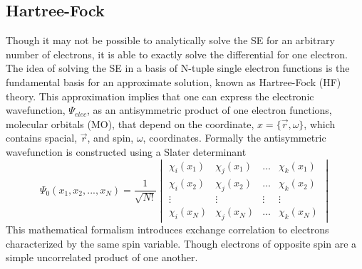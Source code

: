   \subsection{Hartree-Fock}
    Though it may not be possible to analytically solve the SE for an arbitrary number of electrons, it is able to exactly solve the differential for one electron.  The idea of solving the SE in a basis of N-tuple single electron functions is the fundamental basis for an approximate solution, known as Hartree-Fock (HF) theory. \cite{Hartree1928,Fock1930,SzaboAttila1982,Sherril2000} This approximation implies that one can express the electronic wavefunction, $\Psi_{elec}$, as an antisymmetric product of one electron functions, molecular orbitals (MO), that depend on the coordinate, $x = \{\vec{r}, \omega\}$, which contains spacial, $\vec{r}$, and spin, $\omega$, coordinates. Formally the antisymmetric wavefunction is constructed using a Slater determinant\cite{Slater1929,Slater1930} 
    \begin{equation}
    \Psi_{0}(x_1, x_2, ..., x_N) = \frac{1}{\sqrt{N!}}
    \begin{vmatrix}
     \chi_i(x_1) &\chi_j(x_1) &\ldots   &\chi_k(x_1)   \\
     \chi_i(x_2) &\chi_j(x_2)  &\ldots & \chi_k(x_2)   \\
     \vdots&\vdots   &\vdots &\vdots   \\
     \chi_i(x_N) &\chi_j(x_N) & \ldots & \chi_k(x_N)
    \end{vmatrix}
    \end{equation}
    This mathematical formalism introduces exchange correlation to electrons characterized by the same spin variable.  Though electrons of opposite spin are a simple uncorrelated product of one another.
    
